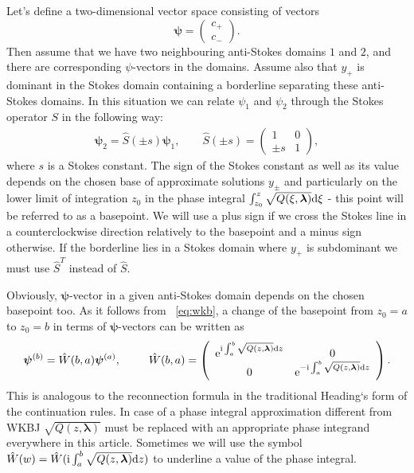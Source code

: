 \documentclass[12pt]{iopart}
\def\S{\hat{S}}
\def\W{\hat{W}}
\def\psii{\bm\psi}
\def\lmbd{\bm{\lambda}}
\begin{document}
Let's define a two-dimensional vector space consisting of vectors
\[
\psii= \left(\begin{array}{*{2}{c}} c_+ \\ c_- \end{array}\right).
\]
Then assume that we have two neighbouring anti-Stokes domains $1$ and $2$, and there are corresponding $\psi$-vectors in the domains. Assume also that $y_+$ is dominant in the Stokes domain containing a borderline separating these anti-Stokes domains. In this situation we can relate $\psi_1$ and $\psi_2$ through the Stokes operator $S$ in the following way:
\begin{eqnarray}
\bm\psi_2 = \S(\pm s) \bm\psi_1, \qquad 
\S(\pm s) = \left(\begin{array}{*{2}{c}} 1 & 0 \\ \pm s & 1 \end{array}\right),    
\label{eq:S}
\end{eqnarray}
where $s$ is a Stokes constant. The sign of the Stokes constant as well as its value depends on the chosen base of approximate solutions $y_\pm$ and particularly on the lower limit of integration $z_0$ in the phase integral $\int_{z_0}^z \sqrt{Q(\xi, \lmbd)} \rmd \xi$ - this point will be referred to as a basepoint. We will use a plus sign if we cross the Stokes line in a counterclockwise direction relatively to the basepoint and a minus sign otherwise. If the borderline lies in a Stokes domain where $y_+$ is subdominant we must use $\S^T$ instead of $\S$.

Obviously, $\psii$-vector in a given anti-Stokes domain depends on the chosen basepoint too. As it follows from ~\ref{eq:wkb}, a change of the basepoint from $z_0=a$ to $z_0=b$ in terms of $\psii$-vectors can be written as
\begin{eqnarray}
\psii^{(b)} = \W(b,a) \psii^{(a)}, \qquad 
\W(b,a) =  
\left(\begin{array}{*{2}{c}}
\rme^{\rmi \int_a^b \sqrt{Q(z,\lmbd)} \rmd z} & 0 \\ 0 & \rme^{-\rmi \int_a^b \sqrt{Q(z,\lmbd)} \rmd z} 
\end{array}\right).    \label{eq:W}
\end{eqnarray}
This is analogous to the reconnection formula in the traditional Heading`s form of the continuation rules. In case of a phase integral approximation different from WKBJ $\sqrt{Q(z,\lmbd)}$ must be replaced with an appropriate phase integrand  everywhere in this article. Sometimes we will use the symbol 
$\W(w)=\W(\rmi \int_a^b \sqrt{Q(z,\lmbd)} \rmd z)$ to underline a value of the phase integral. 
\end{document}
